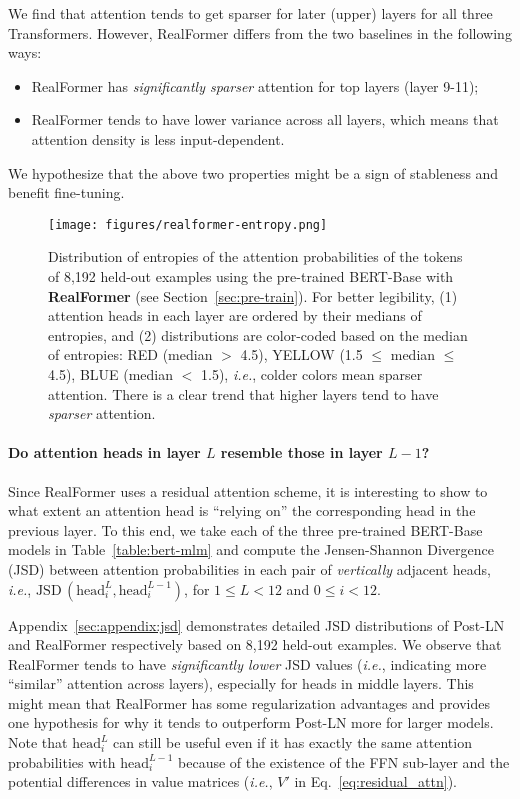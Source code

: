 \documentclass[11pt,a4paper]{article}
\begin{document}
 We find that attention tends to get sparser for later (upper) layers for all three Transformers. However, RealFormer differs from the two baselines in the following ways: 
\begin{itemize}
    \item RealFormer has \emph{significantly sparser} attention for top layers (layer 9-11);
    \item RealFormer tends to have lower variance across all layers, which means that attention density is less input-dependent.
\end{itemize}
We hypothesize that the above two properties might be a sign of stableness and benefit fine-tuning.

\begin{figure*}[!t]
\centering
\texttt{[image: figures/realformer-entropy.png]}
\caption{Distribution of entropies of the attention probabilities of the tokens of 8,192 held-out examples using the pre-trained BERT-Base with \textbf{RealFormer} (see Section~\ref{sec:pre-train}). For better legibility, (1) attention heads in each layer are ordered by their medians of entropies, and (2) distributions are color-coded based on the median of entropies: RED (median $>$ 4.5), YELLOW (1.5 $\le$ median $\le$ 4.5), BLUE (median $<$ 1.5), \emph{i.e.}, colder colors mean sparser attention. There is a clear trend that higher layers tend to have \emph{sparser} attention.}
\label{fig:realformer-entropy}
\end{figure*}


\paragraph{Do attention heads in layer $L$ resemble those in layer $L-1$?}
Since RealFormer uses a residual attention scheme, it is interesting to show to what extent an attention head is ``relying on'' the corresponding head in the previous layer.
To this end, we take each of the three pre-trained BERT-Base models in Table~\ref{table:bert-mlm} and compute the Jensen-Shannon Divergence (JSD) between attention probabilities in each pair of \emph{vertically} adjacent heads, \emph{i.e.}, $\text{JSD}\,(\text{head}^L_i, \text{head}^{L-1}_i)$, for $1 \le L < 12$ and $0 \le i < 12$.

Appendix~\ref{sec:appendix:jsd} demonstrates detailed JSD distributions of Post-LN
and RealFormer respectively based on 8,192 held-out examples. We observe that RealFormer tends to have \emph{significantly lower} JSD values (\emph{i.e.}, indicating more ``similar'' attention across layers), especially for heads in middle layers. This might mean that RealFormer has some regularization advantages and provides one hypothesis for why it tends to outperform Post-LN more for larger models. Note that $\text{head}^L_i$ can still be useful even if it has exactly the same attention probabilities with $\text{head}^{L-1}_i$ because of the existence of the FFN sub-layer and the potential differences in value matrices (\emph{i.e.}, $V'$ in Eq.~\ref{eq:residual_attn}).
\end{document}
